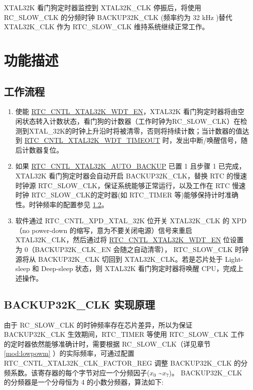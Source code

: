\documentclass[main\_\_CN.tex]{subfiles}
\begin{document}
XTAL32K 看门狗定时器监控到 XTAL32K\_CLK 停振后，将使用 RC\_SLOW\_CLK 的分频时钟
BACKUP32K\_CLK (频率约为 32 kHz )替代 XTAL32K\_CLK 作为 RTC\_SLOW\_CLK 维持系统继续正常工作。

\section{功能描述}

\subsection{工作流程}

\begin{enumerate}
    \item 使能 \hyperref[fielddesc:RTCCNTLXTAL32KWDTEN]{RTC\_CNTL\_XTAL32K\_WDT\_EN}，XTAL32K 看门狗定时器将由空闲状态转入计数状态，看门狗的计数器（工作时钟为RC\_SLOW\_CLK）在检测到XTAL\_32K的时钟上升沿时将被清零，否则将持续计数；当计数器的值达到 \hyperref[fielddesc:RTCCNTLXTAL32KWDTTIMEOUT]{RTC\_CNTL\_XTAL32K\_WDT\_TIMEOUT} 时，发出中断/唤醒信号，随后计数器复位。
    \item 如果 \hyperref[fielddesc:RTCCNTLXTAL32KAUTOBACKUP]{RTC\_CNTL\_XTAL32K\_AUTO\_BACKUP} 已置 1 且步骤 1 已完成，XTAL32K 看门狗定时器会自动开启 BACKUP32K\_CLK，替换 RTC 的慢速时钟源 RTC\_SLOW\_CLK，保证系统能够正常运行，以及工作在 RTC 慢速时钟 RTC\_SLOW\_CLK的定时器(如 RTC\_TIMER 等)能够保持计时准确性。时钟频率的配置参见 \ref{sec:xtwdt-divisor-config}。
    \item 软件通过 RTC\_CNTL\_XPD\_XTAL\_32K 位开关 XTAL32K\_CLK 的 XPD （no power-down 的缩写，意为不要关闭电源）信号来重启 XTAL32K\_CLK，然后通过将 \hyperref[fielddesc:RTCCNTLXTAL32KWDTEN]{RTC\_CNTL\_XTAL32K\_WDT\_EN} 位设置为 0（BACKUP32K\_CLK\_EN 会随之自动清零）， RTC\_SLOW\_CLK 时钟源将从 BACKUP32K\_CLK 切回到 XTAL32K\_CLK。若是芯片处于 Light-sleep 和 Deep-sleep 状态，则 XTAL32K 看门狗定时器将唤醒 CPU，完成上述操作。
\end{enumerate}


\subsection{BACKUP32K\_CLK 实现原理}\label{sec:xtwdt-divisor-config}
由于 RC\_SLOW\_CLK 的时钟频率存在芯片差异，所以为保证 BACKUP32K\_CLK 生效期间，RTC\_TIMER 等使用 RTC\_SLOW\_CLK 工作的定时器依然能够准确计时，需要根据 RC\_SLOW\_CLK（详见章节 \ref{mod:lowpowm}
     \textit{}）的实际频率，可通过配置 RTC\_CNTL\_XTAL32K\_CLK\_FACTOR\_REG 调整 BACKUP32K\_CLK 的分频系数。该寄存器的每个字节对应一个分频因子(\begin{math}x_0\end{math} \textasciitilde \begin{math}x_7\end{math})。
BACKUP32K\_CLK 的分频器是一个分母恒为 4 的小数分频器，算法如下:\\
\end{document}
